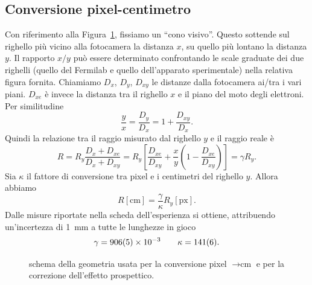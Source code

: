 \documentclass[10pt, a4paper, italian]{article}
\begin{document}
\subsection{Conversione pixel-centimetro}
\label{sec: conv}
Con riferimento alla Figura~\ref{fig:conversione}, fissiamo un ``cono visivo''. Questo sottende sul righello più vicino alla fotocamera la distanza $ x $, su quello più lontano la distanza $ y $. Il rapporto $x/y$ può essere determinato confrontando le scale graduate dei due righelli (quello del Fermilab e quello dell'apparato sperimentale) nella relativa figura fornita. Chiamiamo $ D_{x} $, $ D_{y} $, $ D_{xy} $ le distanze dalla fotocamera ai/tra i vari piani. $ D_{xe} $ è invece la distanza tra il righello $ x $ e il piano del moto degli elettroni.
Per similitudine
\[ \frac{y}{x} = \frac{D_{y}}{D_{x}} = 1 + \frac{D_{xy}}{D_{x}}. \]
Quindi la relazione tra il raggio misurato dal righello $ y $ e il raggio reale è
\[
    R = R_{y} \frac{D_{x} + D_{xe}}{D_{x} + D_{xy}} =
    R_{y} \left[ \frac{D_{xe}}{D_{xy}} + \frac{x}{y} \left(1 - \frac{D_{xe}}{D_{xy}}\right) \right]
    = \gamma R_{y}.
\]
Sia $ \kappa $ il fattore di conversione tra pixel e i centimetri del righello $ y $. Allora abbiamo
\[ R[\si{\centi\meter}] = \frac{\gamma}{\kappa} R_{y}[\mathrm{px}]. \]
Dalle misure riportate nella scheda dell'esperienza si ottiene, attribuendo un'incertezza di \SI{1}{\milli\meter} a tutte le lunghezze in gioco
\[ \gamma = \num{ 906\pm 5 e-3 } \qquad \kappa = \num{ 141 \pm 6 }. \]

\begin{figure}[htbp]
    \centering
    
    \caption{\label{fig:conversione}schema della geometria usata per la conversione pixel $ \to \si{\centi\meter} $ e per la correzione dell'effetto prospettico.}
\end{figure}
\end{document}
